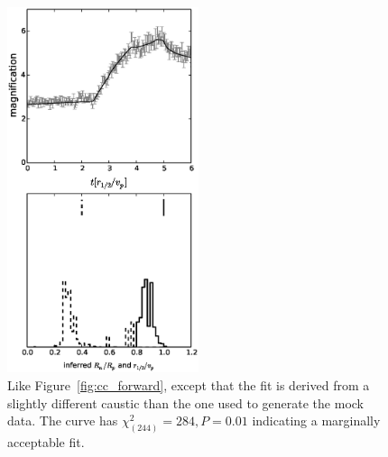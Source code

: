 \documentclass[usenatbib]{mn2e}
\begin{document}
\begin{figure}
\centering
  \includegraphics[width=0.5\textwidth]{figures/cc_backward.eps}
\caption{\label{fig:cc_backward} Like Figure~\ref{fig:cc_forward},
  except that the fit is derived from a slightly different caustic
  than the one used to generate the mock data.  The curve has
  $\chi^2_{(244)}=284, P=0.01$ indicating a marginally acceptable
  fit.}
\end{figure}
\end{document}
